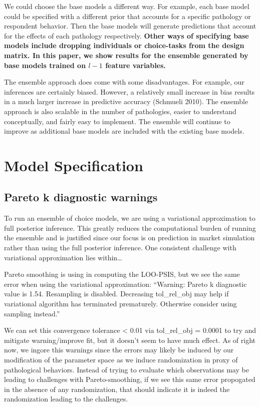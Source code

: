 \documentclass[12pt,titlepage]{mktg-article}
\begin{document}
We could choose the base models a different way. For example, each base model could be specified with a different prior that accounts for a specific pathology or respondent behavior. Then the base models will generate predictions that account for the effects of each pathology respectively. \textbf{Other ways of specifying base models include dropping individuals or choice-tasks from the design matrix. In this paper, we show results for the ensemble generated by base models trained on \(l-1\) feature variables.}

The ensemble approach does come with some disadvantages. For example, our inferences are certainly biased. However, a relatively small increase in bias results in a much larger increase in predictive accuracy (Schmueli 2010). The ensemble approach is also scalable in the number of pathologies, easier to understand conceptually, and fairly easy to implement. The ensemble will continue to improve as additional base models are included with the existing base models.

\hypertarget{model-specification}{%
\section{Model Specification}\label{model-specification}}

\hypertarget{pareto-k-diagnostic-warnings}{%
\subsection{Pareto k diagnostic warnings}\label{pareto-k-diagnostic-warnings}}

To run an ensemble of choice models, we are using a variational approximation to full posterior inference. This greatly reduces the computational burden of running the ensemble and is justified since our focus is on prediction in market simulation rather than using the full posterior inference. One consistent challenge with variational approximation lies within\ldots{}

Pareto smoothing is using in computing the LOO-PSIS, but we see the same error when using the variational approximation: ``Warning: Pareto k diagnostic value is 1.54. Resampling is disabled. Decreasing tol\_rel\_obj may help if variational algorithm has terminated prematurely. Otherwise consider using sampling instead.''

We can set this convergence tolerance \textless{} 0.01 via tol\_rel\_obj = 0.0001 to try and mitigate warning/improve fit, but it doesn't seem to have much effect. As of right now, we ingore this warnings since the errors may likely be induced by our modification of the parameter space as we induce randomization in proxy of pathological behaviors. Instead of trying to evaluate which observations may be leading to challenges with Pareto-smoothing, if we see this same error propogated in the absence of any randomization, that should indicate it is indeed the randomization leading to the challenges.
\end{document}
